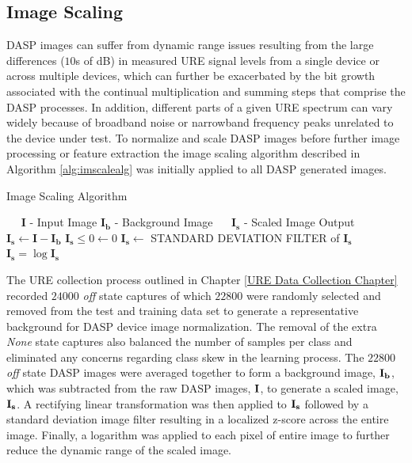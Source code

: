 \subsection[Image Scaling]{Image Scaling}
\label{Image Scaling}

DASP images can suffer from dynamic range issues resulting from the large differences ($10$s of dB) in measured URE signal levels from a single device or across multiple devices, which can further be exacerbated by the bit growth associated with the continual multiplication and summing steps that comprise the DASP processes.  In addition, different parts of a given URE spectrum can vary widely because of broadband noise or narrowband frequency peaks unrelated to the device under test.  To normalize and scale DASP images before further image processing or feature extraction the image scaling algorithm described in Algorithm \ref{alg:imscalealg} was initially applied to all DASP generated images. 

\begin{algorithm}
	\caption{Image Scaling Algorithm} \label{alg:imscalealg}
	\scriptsize
	\begin{algorithmic}[1]
		\Require~~
		\Statex $\mathbf{I}$ - Input Image
		\Statex $\mathbf{I_b}$ - Background Image
		\Ensure~~
		\Statex $\mathbf{I_s}$ - Scaled Image Output
		\Statex
		\State $\mathbf{I_s} \gets \mathbf{I} - \mathbf{I_b}$ 
		\State $\mathbf{I_s} \leq 0 \gets 0$
		\State $\mathbf{I_s}  \gets $ STANDARD DEVIATION FILTER of $\mathbf{I_s}$
		\State $\mathbf{I_s} = \log{\mathbf{I_s}}$
	\end{algorithmic}
\end{algorithm}

The URE collection process outlined in Chapter \ref{URE Data Collection Chapter} recorded $24000$ \textit{off} state captures of which $22800$ were randomly selected and removed from the test and training data set to generate a representative background for DASP device image normalization.  The removal of the extra \textit{None} state captures also balanced the number of samples per class and eliminated any concerns regarding class skew in the learning process.  The $22800$ \textit{off} state DASP images were averaged together to form a background image, $\bf{I_b}$, which was subtracted from the raw DASP images, $\bf{I}$, to generate a scaled image, $\bf{I_s}$.   A rectifying linear transformation was then applied to $\bf{I_s}$ followed by a standard deviation image filter resulting in a localized z-score across the entire image.  Finally, a logarithm was applied to each pixel of entire image to further reduce the dynamic range of the scaled image.  

